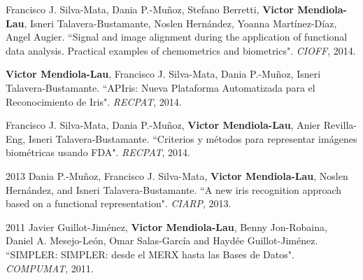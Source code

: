 \documentclass[]{friggeri-cv}
\begin{document}
\begin{paperlist}
  \paperentry
    {}
    {}
    {}
    {
		Francisco J. Silva-Mata, Dania P.-Muñoz, Stefano Berretti, \textbf{Victor Mendiola-Lau}, Isneri Talavera-Bustamante, Noslen Hernández, Yoanna Martínez-Díaz, Angel Augier. ``Signal and image alignment during the application of functional data analysis. Practical examples of chemometrics and biometrics". \emph{CIOFF}, 2014.
    }
\end{paperlist}

\begin{paperlist}
  \paperentry
    {}
    {}
    {}
    {
		\textbf{Victor Mendiola-Lau}, Francisco J. Silva-Mata, Dania P.-Muñoz, Isneri Talavera-Bustamante. ``APIris: Nueva Plataforma Automatizada para el Reconocimiento de Iris". \emph{RECPAT}, 2014.
    }
\end{paperlist}

\begin{paperlist}
  \paperentry
    {}
    {}
    {}
    {
		Francisco J. Silva-Mata, Dania P.-Muñoz, \textbf{Victor Mendiola-Lau}, Anier Revilla-Eng, Isneri Talavera-Bustamante. ``Criterios y métodos para representar imágenes biométricas usando FDA". \emph{RECPAT}, 2014.
    }
\end{paperlist}

\vspace{0.5cm}

\begin{paperlist}
  \paperentry
    {2013}
    {}
    {}
    {
		Dania P.-Muñoz, Francisco J. Silva-Mata, \textbf{Victor Mendiola-Lau}, Noslen Hernández, and Isneri Talavera-Bustamante. ``A new iris recognition approach based on a functional representation". \emph{CIARP}, 2013.
    }
\end{paperlist}

\vspace{0.5cm}

\begin{paperlist}
  \paperentry
    {2011}
    {}
    {}
    {
		Javier Guillot-Jiménez, \textbf{Victor Mendiola-Lau}, Benny Jon-Robaina, Daniel A. Mesejo-León, Omar Salas-García and Haydée Guillot-Jiménez. ``SIMPLER: SIMPLER: desde el MERX hasta las Bases de Datos". \emph{COMPUMAT}, 2011.
    }
\end{paperlist}
\\
\end{document}

